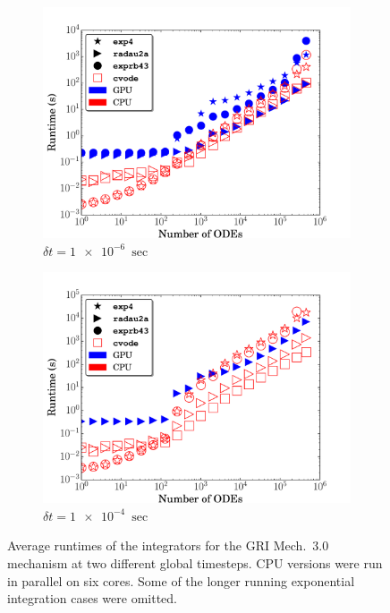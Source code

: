 \documentclass[preprint]{elsarticle}
\begin{document}
\begin{figure}[h]
  \centering
  \begin{subfigure}{0.49\textwidth}
      \includegraphics[width=\linewidth]{GRI_1e-06_cpuvsgpu.pdf}
      \caption{$\delta t = \SI{1e-6}{\sec}$}
  \end{subfigure}
  \begin{subfigure}{0.49\textwidth}
      \includegraphics[width=\linewidth]{GRI_1e-04_cpuvsgpu.pdf}
      \caption{$\delta t = \SI{1e-4}{\sec}$}
  \end{subfigure}
  \caption{Average runtimes of the integrators for the GRI Mech.~3.0 mechanism at two different global timesteps. 
  CPU versions were run in parallel on six cores.
  Some of the longer running exponential integration cases were omitted.}
  \label{F:GRI_perf}
\end{figure}
\end{document}
